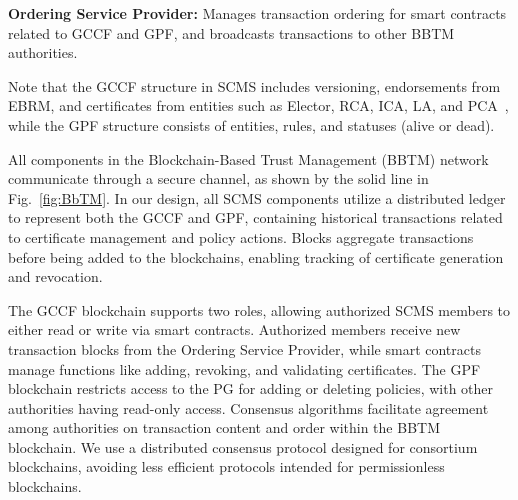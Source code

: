 \textbf{Ordering Service Provider:} Manages transaction ordering for smart contracts related to GCCF and GPF, and broadcasts transactions to other BBTM authorities.  

Note that the GCCF structure in SCMS includes versioning, endorsements from EBRM, and certificates from entities such as Elector, RCA, ICA, LA, and PCA~\cite{GCCFBenedikt}, while the GPF structure consists of entities, rules, and statuses (alive or dead).  

All components in the Blockchain-Based Trust Management (BBTM) network communicate through a secure channel, as shown by the solid line in Fig.~\ref{fig:BbTM}. In our design, all SCMS components utilize a distributed ledger to represent both the GCCF and GPF, containing historical transactions related to certificate management and policy actions. Blocks aggregate transactions before being added to the blockchains, enabling tracking of certificate generation and revocation.

The GCCF blockchain supports two roles, allowing authorized SCMS members to either read or write via smart contracts. Authorized members receive new transaction blocks from the Ordering Service Provider, while smart contracts manage functions like adding, revoking, and validating certificates. The GPF blockchain restricts access to the PG for adding or deleting policies, with other authorities having read-only access. Consensus algorithms facilitate agreement among authorities on transaction content and order within the BBTM blockchain. We use a distributed consensus protocol designed for consortium blockchains, avoiding less efficient protocols intended for permissionless blockchains.

